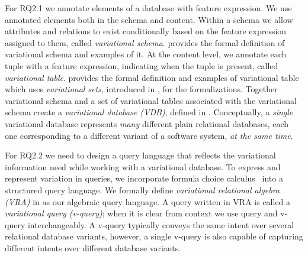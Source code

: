 For RQ2.1 we annotate elements of a database with feature expression.
We use annotated elements both in the schema and content.
Within a schema we allow attributes and relations to exist 
conditionally based on the feature expression assigned to them, called \emph{variational schema}.
 provides the formal definition of variational schema and examples of it.
At the content level, we annotate each tuple with a feature expression, indicating when the tuple 
is present, called \emph{variational table}.
 provides the formal definition and examples of variational table
which uses \emph{variational sets}, introduced in , for the formalizations.
%
Together variational schema and a set of variational tables associated with the 
variational schema create a \emph{variational database (VDB)}, defined in .
Conceptually, a  \emph{single} variational database represents \emph{many}
different plain relational
databases, each one corresponding to a different variant of a software system,
\emph{at the same time}.



\begin{comment}
The variational nature of a VDB requires a query language that
accounts for variation directly.
To express and represent variation in queries,
we incorporate choice calculus~\cite{Walk13thesis, EW11tosem}  into a 
structured query language. We formally define 
\emph{variational relational algebra (VRA)} in \secref{vrel-alg}
as our algebraic query language.
A query written in VRA is called a \emph{variational query (v-query)};
when it is clear from context we use query and v-query interchangeably. 
A v-query typically conveys the same intent over several 
relational database variants, however, a single v-query is also capable of capturing different 
intents over different database variants.
Consequently, the expressiveness of v-queries may cause them to be 
more complicated than relational queries, discussed in \secref{type-sys}. 
Hence, we introduce a 
\emph{type system} for VRA that statically checks if a 
v-query conforms to the underlying v-schema and encoded variability within the VDB.
Finally, we close out this section by providing a set of rules in \secref{var-min} 
for reducing a query's variation.

\end{comment}

For RQ2.2 we need to design a query language that reflects the variational 
information need while working with a variational database. 
To express and represent variation in queries,
we incorporate formula choice calculus~\cite{HW16fosd}  into a 
structured query language. We formally define 
\emph{variational relational algebra (VRA)} in 
as our algebraic query language.
A query written in VRA is called a \emph{variational query (v-query)};
when it is clear from context we use query and v-query interchangeably. 
A v-query typically conveys the same intent over several 
relational database variants, however, a single v-query is also capable of capturing different 
intents over different database variants.


